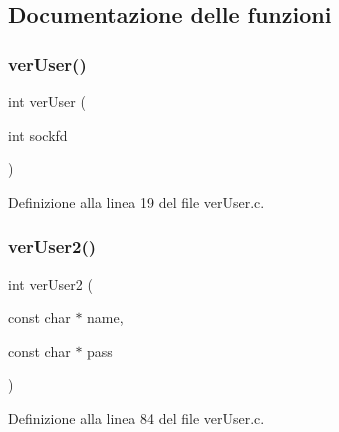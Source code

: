 \subsection{Documentazione delle funzioni}
\mbox{\label{a00059_aec82af81abb495a2314adb5515628cde}} 
\subsubsection{\texorpdfstring{verUser()}{verUser()}}
{\footnotesize\ttfamily int ver\+User (\begin{DoxyParamCaption}\item[{int}]{sockfd }\end{DoxyParamCaption})}



Definizione alla linea 19 del file ver\+User.\+c.

\mbox{\label{a00059_afb6bcf6d0cbea179df5b49e8cfb1a4ae}} 
\subsubsection{\texorpdfstring{verUser2()}{verUser2()}}
{\footnotesize\ttfamily int ver\+User2 (\begin{DoxyParamCaption}\item[{const char $\ast$}]{name,  }\item[{const char $\ast$}]{pass }\end{DoxyParamCaption})}



Definizione alla linea 84 del file ver\+User.\+c.

